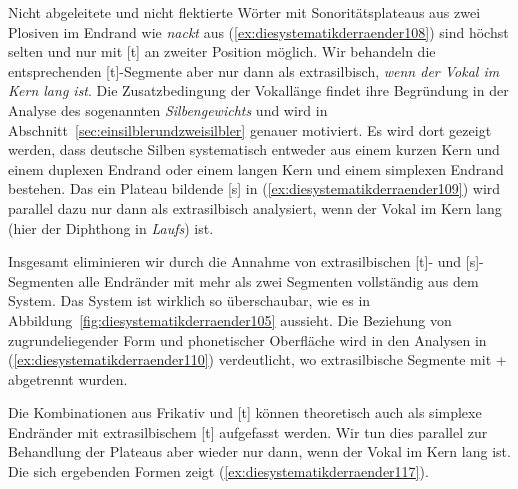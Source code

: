 Nicht abgeleitete und nicht flektierte Wörter mit Sonoritätsplateaus aus zwei Plosiven im Endrand wie \textit{nackt} aus (\ref{ex:diesystematikderraender108}) sind höchst selten und nur mit [t] an zweiter Position möglich.
Wir behandeln die entsprechenden [t]-Segmente aber nur dann als extrasilbisch, \textit{wenn der Vokal im Kern lang ist}.
Die Zusatzbedingung der Vokallänge findet ihre Begründung in der Analyse des sogenannten \textit{Silbengewichts} und wird in Abschnitt~\ref{sec:einsilblerundzweisilbler} genauer motiviert.
Es wird dort gezeigt werden, dass deutsche Silben systematisch entweder aus einem kurzen Kern und einem duplexen Endrand oder einem langen Kern und einem simplexen Endrand bestehen.
Das ein Plateau bildende [s] in (\ref{ex:diesystematikderraender109}) wird parallel dazu nur dann als extrasilbisch analysiert, wenn der Vokal im Kern lang (hier der Diphthong in \textit{Laufs}) ist.

Insgesamt eliminieren wir durch die Annahme von extrasilbischen [t]- und [s]-Seg\-men\-ten alle Endränder mit mehr als zwei Segmenten vollständig aus dem System.
Das System ist wirklich so überschaubar, wie es in Abbildung~\ref{fig:diesystematikderraender105} aussieht.
Die Beziehung von zugrundeliegender Form und phonetischer Oberfläche wird in den Analysen in (\ref{ex:diesystematikderraender110}) verdeutlicht, wo extrasilbische Segmente mit + abgetrennt wurden.

\begin{exe}
  \ex \label{ex:diesystematikderraender110}
  \begin{xlist}
  \end{xlist}
\end{exe}

Die Kombinationen aus Frikativ und [t] können theoretisch auch als simplexe Endränder mit extrasilbischem [t] aufgefasst werden.
Wir tun dies parallel zur Behandlung der Plateaus aber wieder nur dann, wenn der Vokal im Kern lang ist.
Die sich ergebenden Formen zeigt (\ref{ex:diesystematikderraender117}).


